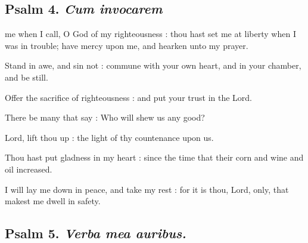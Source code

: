 \subsection{Psalm 4. \textit{Cum invocarem}}

 me when I call, O God of my righteousness : thou hast set me at liberty when I was in trouble; have mercy upon me, and hearken unto my prayer.\par
{}
Stand in awe, and sin not : commune with your own heart, and in your chamber, and be still.\par
{}Offer the sacrifice of righteousness : and put your trust in the Lord.\par
{}There be many that say : Who will shew us any good?\par
{}Lord, lift thou up : the light of thy countenance upon us.\par
{}Thou hast put gladness in my heart : since the time that their corn and wine and oil increased.\par
{}I will lay me down in peace, and take my rest : for it is thou, Lord, only, that makest me dwell in safety.\par

\clearpage
\subsection{Psalm 5. \textit{Verba mea auribus.}}

